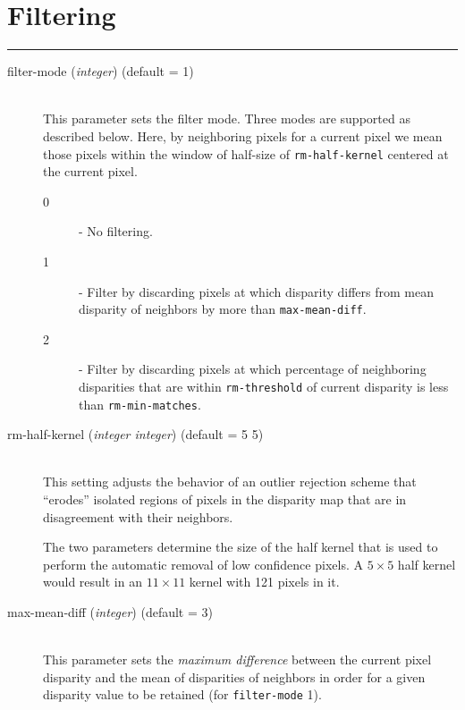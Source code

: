 
\section{Filtering}
\label{filter_options}

\hrule
\bigskip

\begin{description}

\item[filter-mode \textnormal{\small{(\emph{integer})}} (default = 1)]
\hfill \\ This parameter sets the filter mode. Three modes are supported
as described below. Here, by neighboring pixels for a current pixel we
mean those pixels within the window of half-size of
\texttt{rm-half-kernel} centered at the current pixel.
  \begin{description}
    \item[0] - No filtering.
    \item[1] - Filter by discarding pixels at which disparity differs from mean disparity of neighbors by more than \texttt{max-mean-diff}.
    \item[2] - Filter by discarding pixels at which percentage of neighboring disparities that are within \texttt{rm-threshold} of current disparity is less than \texttt{rm-min-matches}.
  \end{description}

\item[rm-half-kernel \textnormal{\small{(\emph{integer integer})}} (default = 5 5)] \hfill \\
  This setting adjusts the behavior of an outlier rejection scheme
  that ``erodes'' isolated regions of pixels in the disparity map that
  are in disagreement with their neighbors.

  The two parameters determine the size of the half kernel that is
  used to perform the automatic removal of low confidence pixels.  A
  $5 \times 5$ half kernel would result in an $11 \times 11$ kernel
  with 121 pixels in it.

\item[max-mean-diff \textnormal{\small{(\emph{integer})}} (default = 3)] \hfill \\
  This parameter sets the {\em maximum difference} between the current pixel disparity and the mean of disparities of neighbors in order for a
  given disparity value to be retained (for \texttt{filter-mode} 1).


\end{description}
